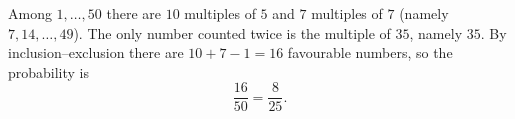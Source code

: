Among $1,\dots,50$ there are $10$ multiples of $5$ and $7$ multiples of $7$ (namely $7,14,\dots,49$). The only number counted twice is the multiple of $35$, namely $35$. By inclusion--exclusion there are $10+7-1=16$ favourable numbers, so the probability is
\[
\dfrac{16}{50}=\boxed{\dfrac{8}{25}} .
\]
